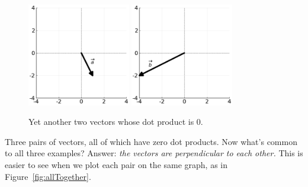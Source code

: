 \begin{figure}[ht]
\centering
\includegraphics[width=0.40\textwidth]{dotProduct3a.png}
\includegraphics[width=0.40\textwidth]{dotProduct3b.png}
\caption{Yet another two vectors whose dot product is 0.}
\label{fig:dotproduct3}
\end{figure}

\bigskip


Three pairs of vectors, all of which have zero dot products. Now what's common
to all three examples? Answer: \textit{the vectors are perpendicular to each
other.} This is easier to see when we plot each pair on the same graph, as in
Figure~\ref{fig:allTogether}.

